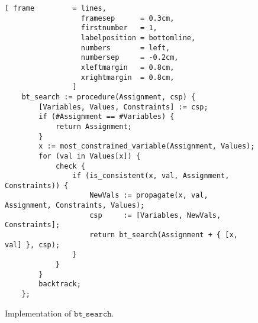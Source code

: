 \begin{figure}[!ht]
\centering
\begin{Verbatim}[ frame         = lines, 
                  framesep      = 0.3cm, 
                  firstnumber   = 1,
                  labelposition = bottomline,
                  numbers       = left,
                  numbersep     = -0.2cm,
                  xleftmargin   = 0.8cm,
                  xrightmargin  = 0.8cm,
                ]
    bt_search := procedure(Assignment, csp) {
        [Variables, Values, Constraints] := csp;
        if (#Assignment == #Variables) {
            return Assignment;
        }
        x := most_constrained_variable(Assignment, Values);
        for (val in Values[x]) {
            check {
                if (is_consistent(x, val, Assignment, Constraints)) {
                    NewVals := propagate(x, val, Assignment, Constraints, Values);
                    csp     := [Variables, NewVals, Constraints];
                    return bt_search(Assignment + { [x, val] }, csp);
                }
            }
        }
        backtrack;
    };
\end{Verbatim}
\vspace*{-0.3cm}
\caption{Implementation of $\mathtt{bt\_search}$.}
\label{fig:csp-constraint-propagation.stlx:bt_search}
\end{figure}

